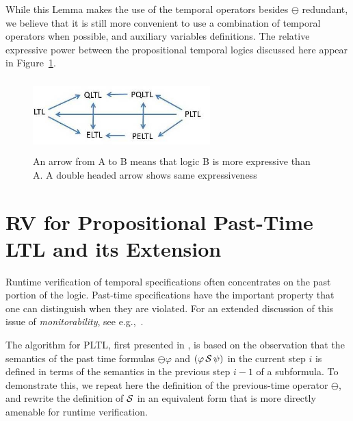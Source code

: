 

While this Lemma makes the use of the temporal operators
besides $\ominus$ redundant, we believe that it is still
more convenient to use a combination of
temporal operators when possible, and
auxiliary variables definitions.
The relative expressive power between the propositional temporal logics discussed here
appear in Figure~\ref{prop}.






\begin{figure}
\begin{center}
\includegraphics[height=1.1in,width=2.7in]{PROP.jpg}
\caption{\label{prop} An arrow from A to B means that logic  B is more expressive than A. A double headed arrow shows same expressiveness}
\end{center}
\end{figure}




\section{RV for Propositional Past-Time LTL and its Extension}
\label{LTLruntime}

Runtime verification of temporal specifications often
concentrates on the past portion of the logic.  Past-time  specifications have the important property that one can distinguish when they are violated. For an extended discussion of this issue of {\em monitorability}, see e.g.,~\cite{Ugly,FFM}.

The algorithm for PLTL, first presented in \cite{HR}, 
is based on the observation that the semantics of the 
past time formulas $\ominus \varphi$ and $(\varphi\, {\cal S} \,\psi)$ in the current step $i$ is defined in terms of the semantics
in the previous step $i - 1$ of a subformula.
To demonstrate this, we repeat here the definition of the previous-time
operator $\ominus$, and rewrite the definition
of ${\cal S}$ in an equivalent form that is
more directly amenable for runtime verification.

